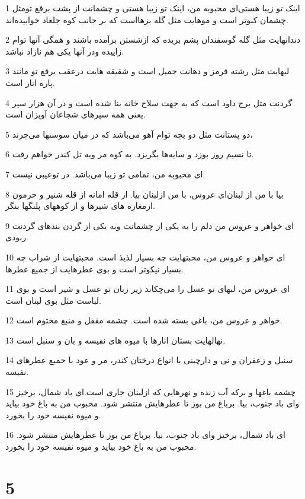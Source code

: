 \par 1 اینک تو زیبا هستی‌ای محبوبه من، اینک تو زیبا هستی و چشمانت از پشت برقع تومثل چشمان کبوتر است و موهایت مثل گله بزهااست که بر جانب کوه جلعاد خوابیده‌اند.
\par 2 دندانهایت مثل گله گوسفندان پشم بریده که ازشستن برآمده باشند و همگی آنها توام زاییده ودر آنها یکی هم نازاد نباشد.
\par 3 لبهایت مثل رشته قرمز و دهانت جمیل است و شقیقه هایت درعقب برقع تو مانند پاره انار است.
\par 4 گردنت مثل برج داود است که به جهت سلاح خانه بنا شده است و در آن هزار سپر یعنی همه سپرهای شجاعان آویزان است.
\par 5 دو پستانت مثل دو بچه توام آهو می‌باشد که در میان سوسنها می‌چرند،
\par 6 تا نسیم روز بوزد و سایه‌ها بگریزد. به کوه مر وبه تل کندر خواهم رفت.
\par 7 ‌ای محبوبه من، تمامی تو زیبا می‌باشد. در توعیبی نیست.
\par 8 بیا با من از لبنان‌ای عروس، با من ازلبنان بیا. از قله امانه از قله شنیر و حرمون ازمغاره های شیرها و از کوههای پلنگها بنگر.
\par 9 ‌ای خواهر و عروس من دلم را به یکی از چشمانت وبه یکی از گردن بندهای گردنت ربودی.
\par 10 ‌ای خواهر و عروس من، محبتهایت چه بسیار لذیذ است. محبتهایت از شراب چه بسیار نیکوتر است و بوی عطرهایت از جمیع عطرها.
\par 11 ‌ای عروس من، لبهای تو عسل را می‌چکاند زیر زبان تو عسل و شیر است و بوی لباست مثل بوی لبنان است.
\par 12 خواهر و عروس من، باغی بسته شده است. چشمه مقفل و منبع مختوم است.
\par 13 نهالهایت بستان انارها با میوه های نفیسه و بان و سنبل است.
\par 14 سنبل و زعفران و نی و دارچینی با انواع درختان کندر، مر و عود با جمیع عطرهای نفیسه.
\par 15 چشمه باغها و برکه آب زنده و نهرهایی که ازلبنان جاری است.‌ای باد شمال، برخیز و‌ای باد جنوب، بیا. برباغ من بوز تا عطرهایش منتشر شود. محبوب من به باغ خود بیاید و میوه نفیسه خود را بخورد.
\par 16 ‌ای باد شمال، برخیز و‌ای باد جنوب، بیا. برباغ من بوز تا عطرهایش منتشر شود. محبوب من به باغ خود بیاید و میوه نفیسه خود را بخورد.
 
\chapter{5}

